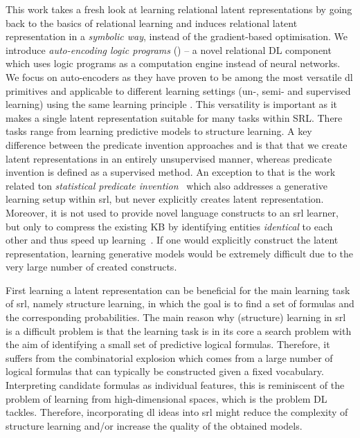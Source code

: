 This work takes a fresh look at learning relational latent representations by going back to the basics of relational learning and induces relational latent representation in a \textit{symbolic way}, instead of the gradient-based optimisation.
We introduce \textit{auto-encoding logic programs} () -- a novel relational DL component which uses logic programs as a computation engine instead of neural networks.
We focus on auto-encoders as they have proven to be among the most versatile \gls{dl} primitives and applicable to different learning settings (un-, semi- and supervised learning) using the same learning principle \cite{SSLVAE2014,VincentDaE,Kingma2014,BengioSAE}.
This versatility is important as it makes a single latent representation suitable for many tasks within SRL.
There tasks range from learning predictive models to structure learning.
A key difference between the predicate invention approaches and  is that that we create latent representations in an entirely unsupervised manner, whereas predicate invention is defined as a supervised method.
An exception to that is the work related ton \textit{statistical predicate invention}~\cite{Kok2007} which also addresses a generative learning setup within \gls{srl}, but never explicitly creates latent representation.
Moreover, it is not used to provide novel language constructs to an \gls{srl} learner, but only to compress the existing KB by identifying entities \textit{identical} to each other and thus speed up learning~\cite{Kok:2009:LML:1553374.1553440}.
If one would explicitly construct the latent representation, learning generative models would be extremely difficult due to the very large number of created constructs.




First learning a latent representation can be beneficial for the main learning task of \gls{srl}, namely structure learning, in which the goal is to find a set of formulas and the corresponding probabilities.
The main reason why (structure) learning in \gls{srl} is a difficult problem is that the learning task is in its core a search problem with the aim of identifying a small set of predictive logical formulas.
Therefore, it suffers from the combinatorial explosion which comes from a large number of logical formulas that can typically be constructed given a fixed vocabulary.
Interpreting candidate formulas as individual features, this is reminiscent of the problem of learning from high-dimensional spaces, which is the problem DL tackles.
Therefore, incorporating \gls{dl} ideas into \gls{srl} might reduce the complexity of structure learning and/or increase the quality of the obtained models.


